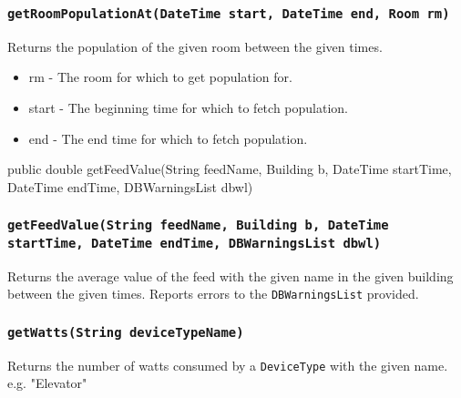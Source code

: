 \documentclass[12pt,a4paper]{article}
\begin{document}
\subsubsection{\texttt{getRoomPopulationAt(DateTime start, DateTime end, Room rm)}}
Returns the population of the given room between the given times.
\begin{itemize}
  \item rm - The room for which to get population for.
  \item start - The beginning time for which to fetch population.
  \item end - The end time for which to fetch population.
\end{itemize}


	public double getFeedValue(String feedName, Building b, DateTime startTime, DateTime endTime, DBWarningsList dbwl)

\subsubsection[getFeedValue(...)]{\texttt{getFeedValue(String feedName, Building b, DateTime startTime, DateTime endTime, DBWarningsList dbwl)}}

Returns the average value of the feed with the given name in the given building
between the given times. Reports errors to the \texttt{DBWarningsList} provided.

\subsubsection{\texttt{getWatts(String deviceTypeName)}}
Returns the number of watts consumed by a \texttt{DeviceType} with the given name. e.g. "Elevator"
\end{document}
